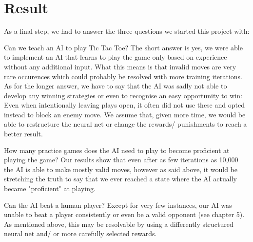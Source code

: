 \section{Result}
As a final step, we had to answer the three questions we started this project with:

Can we teach an AI to play Tic Tac Toe?
The short answer is yes, we were able to implement an AI that learns to play the game only based on experience without any additional input. What this means is that invalid moves are very rare occurences which could probably be resolved with more training iterations.
As for the longer answer, we have to say that the AI was sadly not able to develop any winning strategies or even to recognise an easy opportunity to win: Even when intentionally leaving plays open, it often did not use these and opted instead to block an enemy move.
We assume that, given more time, we would be able to restructure the neural net or change the rewards/ punishments to reach a better result.

How many practice games does the AI need to play to become proficient at playing the game?
Our results show that even after as few iterations as 10,000 the AI is able to make mostly valid moves, however as said above, it would be stretching the truth to say that we ever reached a state where the AI actually became "proficient" at playing.

Can the AI beat a human player?
Except for very few instances, our AI was unable to beat a player consistently or even be a valid opponent (see chapter 5). As mentioned above, this may be resolvable by using a differently structured neural net and/ or more carefully selected rewards.